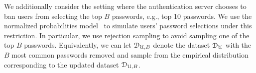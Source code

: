  We additionally consider the setting where the authentication server chooses to ban users from selecting the top $B$ passwords, e.g., top 10 passwords. We use the normalized probabilities model~\cite{BKPS:ACMEC13} to simulate users' password selections under this restriction. In particular, we use rejection sampling to avoid sampling one of the top $B$ passwords. Equivalently, we can let $\mathcal{D}_{{\mathcal{U}, B}}$ denote the dataset $\mathcal{D}_{{\mathcal{U}}}$ with the $B$ most common passwords removed and sample from the empirical distribution corresponding to the updated dataset $\mathcal{D}_{{\mathcal{U}, B}}$.









\vspace*{-\baselineskip}
\vspace*{-\baselineskip}


